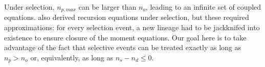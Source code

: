 \documentclass[review]{elsarticle}
\newcommand{\ra}{\rightarrow}
\newcommand{\afs}[2]{\Phi_{#1}^{(#2)}}
\newcommand{\sgcomment}[1]{\textcolor{red}{SG: #1}}
\newcommand{\ikcomment}[1]{\textcolor{blue}{IK: #1}}
\begin{document}
Under selection, $n_{p,max}$ can be larger than $n_o$, leading to an infinite set of coupled equations. 
\cite{JouganousEtAl2017} also derived recursion equations under selection, but these required approximations: 
for every selection event, a new lineage had to be jackknifed into existence to ensure closure of the moment equations. 
Our goal here is to take advantage of the fact that selective events can be treated exactly as long as  $n_p > n_o$ or,  
equivalently, as long as  $n_s - n_d \leq 0.$
 
 
%   
%
%
%
%
%
%
%
%
%
%
%
%
%
%
%
%
%
%
%
%
%
%
%
\end{document}
